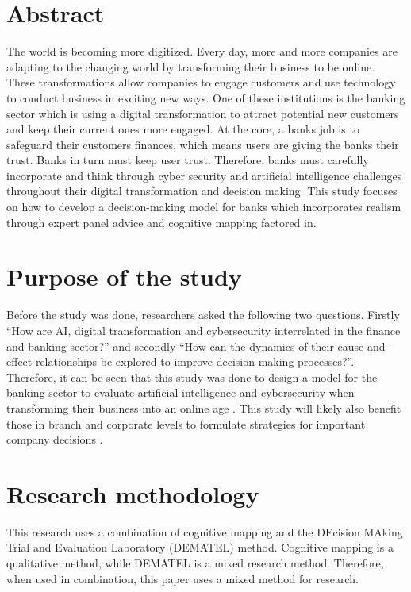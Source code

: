 \documentclass{article}
\begin{document}
\section*{Abstract}
The world is becoming more digitized. Every day, more and more companies are adapting to the changing world by transforming their business to be online. These transformations allow companies to engage customers and use technology to conduct business in exciting new ways. One of these institutions is the banking sector which is using a digital transformation to attract potential new customers and keep their current ones more engaged. At the core, a banks job is to safeguard their customers finances, which means users are giving the banks their trust. Banks in turn must keep user trust. Therefore, banks must carefully incorporate and think through cyber security and artificial intelligence challenges throughout their digital transformation and decision making. This study focuses on how to develop a decision-making model for banks which incorporates realism through expert panel advice and cognitive mapping factored in. \\

\section*{Purpose of the study}
Before the study was done, researchers asked the following two questions. Firstly “How are AI, digital transformation and cybersecurity interrelated in the finance and banking sector?” and secondly “How can the dynamics of their cause-and-effect relationships be explored to improve decision-making processes?”. Therefore, it can be seen that this study was done to design a model for the banking sector to evaluate artificial intelligence and cybersecurity when transforming their business into an online age \cite{SHAIKH20171030}. This study will likely also benefit those in branch and corporate levels to formulate strategies for important company decisions \cite{EDEN2004615}. \\
\section*{Research methodology}
This research uses a combination of cognitive mapping and the DEcision MAking Trial and Evaluation Laboratory (DEMATEL) method. Cognitive mapping is a qualitative method, while DEMATEL is a mixed research method. Therefore, when used in combination, this paper uses a mixed method for research.\\
\end{document}
